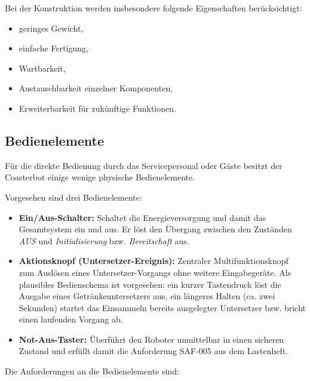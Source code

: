 Bei der Konstruktion werden insbesondere folgende Eigenschaften
berücksichtigt:

\begin{itemize}
\tightlist
\item
  geringes Gewicht,
\item
  einfache Fertigung,
\item
  Wartbarkeit,
\item
  Austauschbarkeit einzelner Komponenten,
\item
  Erweiterbarkeit für zukünftige Funktionen.
\end{itemize}

\subsection{Bedienelemente}\label{bedienelemente}

Für die direkte Bedienung durch das Servicepersonal oder Gäste besitzt
der Coasterbot einige wenige physische Bedienelemente.

Vorgesehen sind drei Bedienelemente:

\begin{itemize}
\tightlist
\item
  \textbf{Ein/Aus-Schalter:} Schaltet die Energieversorgung und damit
  das Gesamtsystem ein und aus. Er löst den Übergang zwischen den
  Zuständen \emph{AUS} und \emph{Initialisierung} bzw.
  \emph{Bereitschaft} aus.
\item
  \textbf{Aktionsknopf (Untersetzer-Ereignis):} Zentraler
  Multifunktionsknopf zum Auslösen eines Untersetzer-Vorgangs ohne
  weitere Eingabegeräte. Als plausibles Bedienschema ist vorgesehen: ein
  kurzer Tastendruck löst die Ausgabe eines Getränkeuntersetzers aus,
  ein längeres Halten (ca. zwei Sekunden) startet das Einsammeln bereits
  ausgelegter Untersetzer bzw. bricht einen laufenden Vorgang ab.
\item
  \textbf{Not-Aus-Taster:} Überführt den Roboter unmittelbar in einen
  sicheren Zustand und erfüllt damit die Anforderung SAF-005 aus dem
  Lastenheft.
\end{itemize}

Die Anforderungen an die Bedienelemente sind:

